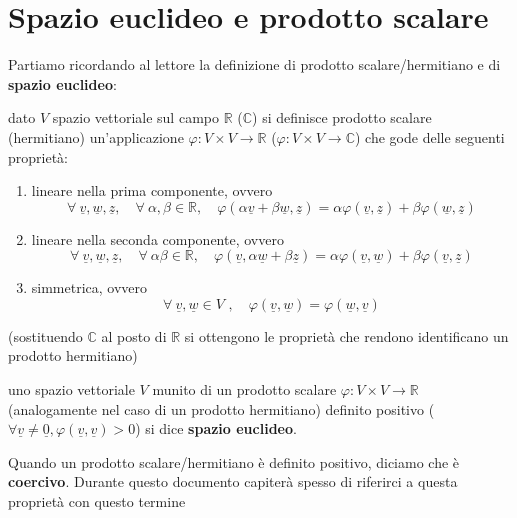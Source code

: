 \section{Spazio euclideo e prodotto scalare}
Partiamo ricordando al lettore la definizione di prodotto scalare/hermitiano e di \textbf{spazio euclideo}:
%
\vspace{0.5cm}
\begin{definition}[\textcolor{blue}{prodotto scalare/hermitiano}]
	dato $V$ spazio vettoriale sul campo $\mathbb{R}$ ($\mathbb{C}$) si definisce prodotto scalare (hermitiano) un'applicazione $\varphi: V \times V \to \mathbb{R}$ ($\varphi: V \times V \to \mathbb{C}$) che gode delle seguenti proprietà:
	\begin{enumerate}[label=\protect\circled{\arabic*}]
			\item lineare nella prima componente, ovvero
			\[
			\forall\ \underline{v}, \underline{w}, \underline{z},\quad \forall\ \alpha, \beta \in \mathbb{R},\quad \varphi(\alpha \underline{v} + \beta \underline{w}, \underline{z}) = \alpha \varphi(\underline{v}, \underline{z}) + \beta \varphi(\underline{w}, \underline{z})
			\]
			\item lineare nella seconda componente, ovvero
			\[
			\forall\ \underline{v}, \underline{w}, \underline{z},\quad \forall\ \alpha \beta \in \mathbb{R},\quad \varphi(\underline{v}, \alpha \underline{w} + \beta \underline{z}) = \alpha \varphi(\underline{v}, \underline{w}) + \beta \varphi(\underline{v}, \underline{z})
			\]
			\item simmetrica, ovvero
			\[
			\forall\ \underline{v}, \underline{w} \in V \, \, ,\quad \varphi(\underline{v}, \underline{w}) = \varphi(\underline{w}, \underline{v})
			\]
	\end{enumerate}
	(sostituendo $\mathbb{C}$ al posto di $\mathbb{R}$ si ottengono le proprietà che rendono identificano un prodotto hermitiano)
\end{definition}
%
%	
\vspace{0.5cm}
\begin{definition}[\textcolor{blue}{spazio euclideo}]
uno spazio vettoriale $V$ munito di un prodotto scalare $\varphi: V \times V \to \mathbb{R}$ (analogamente nel caso di un prodotto hermitiano) definito positivo ($\forall \underline{v} \neq \underline{0}, \varphi(\underline{v}, \underline{v}) > 0$) si dice \textbf{spazio euclideo}.
\end{definition}
%
\begin{remark}
	Quando un prodotto scalare/hermitiano è definito positivo, diciamo che è \textbf{coercivo}. Durante questo documento capiterà spesso di riferirci a questa proprietà con questo termine
\end{remark}
